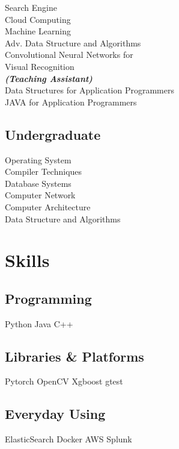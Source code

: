 \documentclass[letterpaper]{deedy-resume} %
\begin{document}
\begin{minipage}[t]{0.33\textwidth}
Search Engine \\
Cloud Computing \\
Machine Learning \\
Adv. Data Structure and Algorithms \\
Convolutional Neural Networks for \\
Visual Recognition \\

{\footnotesize \textit{\textbf{(Teaching Assistant) }}} \\
Data Structures for Application Programmers \\
JAVA for Application Programmers

\sectionspace %


\subsection{Undergraduate}

Operating System \\
Compiler Techniques \\
Database Systems \\
Computer Network \\
Computer Architecture \\
Data Structure and Algorithms \\

\sectionspace %


\section{Skills}

\subsection{Programming}
Python \textbullet{} Java \textbullet{} C++
\sectionspace
\subsection{Libraries \& Platforms}
\textbullet{} Pytorch \textbullet{} OpenCV \textbullet{} Xgboost \textbullet{} gtest
\sectionspace
\subsection{Everyday Using}
ElasticSearch \textbullet{} Docker \textbullet{} AWS \textbullet{} Splunk

\sectionspace %


\end{minipage} %
\end{document}

